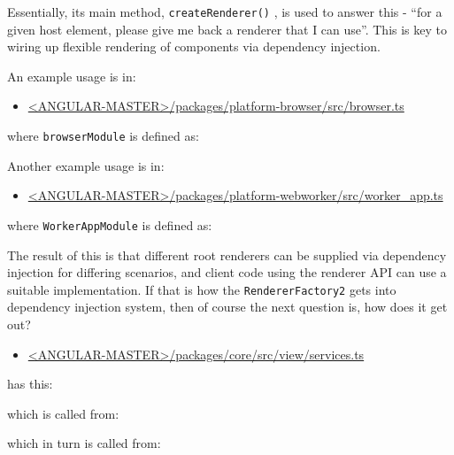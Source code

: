 

Essentially, its main method,
\texttt{createRenderer()}
, is used to answer this - “for a given
host element, please give me back a renderer that I can use”. This is key to wiring up
flexible rendering of components via dependency injection.

An example usage is in:

\begin{itemize}
  \item \href{https://github.com/angular/angular/blob/master/packages/platform-browser/src/browser.ts}
        {<ANGULAR-MASTER>/packages/platform-browser/src/browser.ts}
\end{itemize}

where
\texttt{browserModule}
is defined as:



Another example usage is in:

\begin{itemize}
  \item \href{https://github.com/angular/angular/blob/master/packages/platform-webworker/src/worker_app.ts}
        {<ANGULAR-MASTER>/packages/platform-webworker/src/worker\_app.ts}
\end{itemize}

where
\texttt{WorkerAppModule}
is defined as:



The result of this is that different root renderers can be supplied via dependency
injection for differing scenarios, and client code using the renderer API can use a
suitable implementation. If that is how the
\texttt{RendererFactory2}
gets into dependency
injection system, then of course the next question is, how does it get out?

\begin{itemize}
  \item \href{https://github.com/angular/angular/blob/master/packages/core/src/view/services.ts}
        {<ANGULAR-MASTER>/packages/core/src/view/services.ts}
\end{itemize}

has this:



which is called from:



which in turn is called from:

